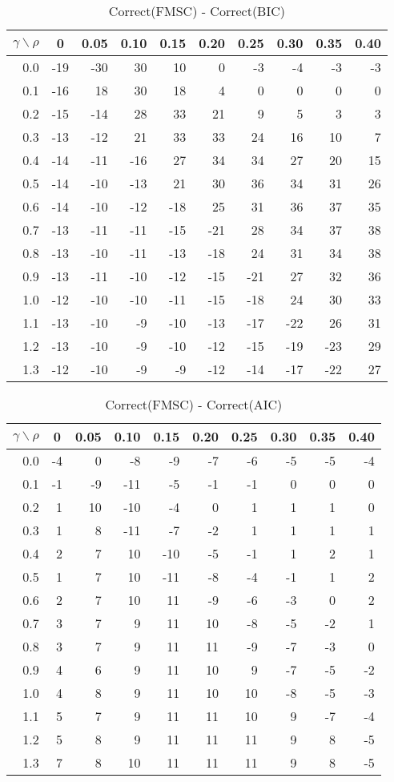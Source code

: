 \documentclass[12pt]{article}
\begin{document}
\begin{table}[!tbp]
\caption{Correct(FMSC) - Correct(BIC)}
 \begin{center}
 \begin{tabular}{r|rrrrrrrrr}\hline\hline
\multicolumn{1}{c|}{$\gamma\backslash\rho$}&\multicolumn{1}{c}{0}&\multicolumn{1}{c}{0.05}&\multicolumn{1}{c}{0.10}&\multicolumn{1}{c}{0.15}&\multicolumn{1}{c}{0.20}&\multicolumn{1}{c}{0.25}&\multicolumn{1}{c}{0.30}&\multicolumn{1}{c}{0.35}&\multicolumn{1}{c}{0.40}\tabularnewline
\hline


0.0&-19&-30& 30& 10&  0& -3& -4& -3&-3\tabularnewline
0.1&-16& 18& 30& 18&  4&  0&  0&  0& 0\tabularnewline
0.2&-15&-14& 28& 33& 21&  9&  5&  3& 3\tabularnewline
0.3&-13&-12& 21& 33& 33& 24& 16& 10& 7\tabularnewline
0.4&-14&-11&-16& 27& 34& 34& 27& 20&15\tabularnewline
0.5&-14&-10&-13& 21& 30& 36& 34& 31&26\tabularnewline
0.6&-14&-10&-12&-18& 25& 31& 36& 37&35\tabularnewline
0.7&-13&-11&-11&-15&-21& 28& 34& 37&38\tabularnewline
0.8&-13&-10&-11&-13&-18& 24& 31& 34&38\tabularnewline
0.9&-13&-11&-10&-12&-15&-21& 27& 32&36\tabularnewline
1.0&-12&-10&-10&-11&-15&-18& 24& 30&33\tabularnewline
1.1&-13&-10& -9&-10&-13&-17&-22& 26&31\tabularnewline
1.2&-13&-10& -9&-10&-12&-15&-19&-23&29\tabularnewline
1.3&-12&-10& -9& -9&-12&-14&-17&-22&27\tabularnewline
\hline
\end{tabular}

\end{center}

\end{table}

%

\begin{table}[!tbp]
\caption{Correct(FMSC) - Correct(AIC)}
 \begin{center}
 \begin{tabular}{r|rrrrrrrrr}\hline\hline
\multicolumn{1}{c|}{$\gamma\backslash\rho$}&\multicolumn{1}{c}{0}&\multicolumn{1}{c}{0.05}&\multicolumn{1}{c}{0.10}&\multicolumn{1}{c}{0.15}&\multicolumn{1}{c}{0.20}&\multicolumn{1}{c}{0.25}&\multicolumn{1}{c}{0.30}&\multicolumn{1}{c}{0.35}&\multicolumn{1}{c}{0.40}\tabularnewline
\hline


0.0&-4& 0& -8& -9&-7&-6&-5&-5&-4\tabularnewline
0.1&-1&-9&-11& -5&-1&-1& 0& 0& 0\tabularnewline
0.2& 1&10&-10& -4& 0& 1& 1& 1& 0\tabularnewline
0.3& 1& 8&-11& -7&-2& 1& 1& 1& 1\tabularnewline
0.4& 2& 7& 10&-10&-5&-1& 1& 2& 1\tabularnewline
0.5& 1& 7& 10&-11&-8&-4&-1& 1& 2\tabularnewline
0.6& 2& 7& 10& 11&-9&-6&-3& 0& 2\tabularnewline
0.7& 3& 7&  9& 11&10&-8&-5&-2& 1\tabularnewline
0.8& 3& 7&  9& 11&11&-9&-7&-3& 0\tabularnewline
0.9& 4& 6&  9& 11&10& 9&-7&-5&-2\tabularnewline
1.0& 4& 8&  9& 11&10&10&-8&-5&-3\tabularnewline
1.1& 5& 7&  9& 11&11&10& 9&-7&-4\tabularnewline
1.2& 5& 8&  9& 11&11&11& 9& 8&-5\tabularnewline
1.3& 7& 8& 10& 11&11&11& 9& 8&-5\tabularnewline
\hline
\end{tabular}

\end{center}

\end{table}
\end{document}
